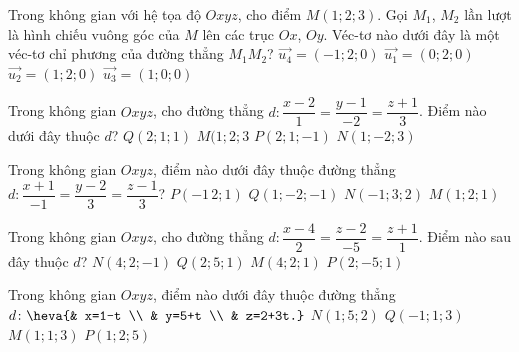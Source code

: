 \begin{ex}%
Trong không gian với hệ tọa độ $Oxyz$, cho điểm $M( 1;2;3 )$. Gọi ${M}_{1}$, ${M}_{2}$ lần lượt là hình chiếu vuông góc của $M$ lên các trục $Ox$, $Oy$. Véc-tơ nào dưới đây là một véc-tơ chỉ phương của đường thẳng $M_1M_2$?
\choice
{ \True $\overrightarrow{{{u}_{4}}}=( -1;2;0 )$}
{ $\overrightarrow{{u}_{1}}=( 0;2;0)$}
{  $\overrightarrow {u_2}=( 1;2;0 )$}
{ $\overrightarrow{{{u}_{3}}}=( 1;0;0 )$}
\end{ex}
\begin{ex}%
Trong không gian $Oxyz$, cho đường thẳng $d \colon\dfrac{x-2}{1}=\dfrac{y-1}{-2}=\dfrac{z+1}{3}$. Điểm nào dưới đây thuộc $d$?
	\choice
{ $Q( 2;1;1 )$}
{ $M( 1;2;3 $}
{ \True $P( 2;1;-1)$}
{ $N( 1;-2;3) $}
\end{ex}
\begin{ex}%
Trong không gian $Oxyz$, điểm nào dưới đây thuộc đường thẳng $d \colon \dfrac{x+1}{-1}=\dfrac{y-2}{3}=\dfrac{z-1}{3}$?
\choice
	{\True $P(-1\,2;1)$}
	{ $Q(1;-2;-1)$}
	{ $N(-1;3;2)$}
	{ $M( 1;2;1)$}
\end{ex}
\begin{ex}%
Trong không gian $Oxyz$, cho đường thẳng $d \colon \dfrac{x-4}{2}=\dfrac{z-2}{-5}=\dfrac{z+1}{1}$. Điểm nào sau đây thuộc $d$?
	\choice
	{ \True $N(4;2;-1)$}
	{ $Q(2;5;1)$}
	{ $M(4;2;1)$}
	{ $P(2;-5;1)$}
\end{ex}
\begin{ex}%
Trong không gian $Oxyz$, điểm nào dưới đây thuộc đường thẳng $d \colon 
\heva{& x=1-t \\ 
	& y=5+t \\ 
	& z=2+3t.}$
\choice
	{ \True $N(1;5;2)$}
	{ $Q(-1;1;3)$}
	{ $M(1;1;3)$}
	{ $P(1;2;5)$}
\end{ex}
